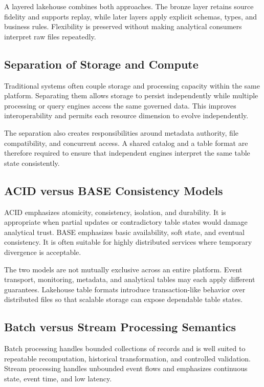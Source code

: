 A layered lakehouse combines both approaches. The bronze layer retains source fidelity and supports replay, while later layers apply explicit schemas, types, and business rules. Flexibility is preserved without making analytical consumers interpret raw files repeatedly.

\subsection{Separation of Storage and Compute}
Traditional systems often couple storage and processing capacity within the same platform. Separating them allows storage to persist independently while multiple processing or query engines access the same governed data. This improves interoperability and permits each resource dimension to evolve independently.

The separation also creates responsibilities around metadata authority, file compatibility, and concurrent access. A shared catalog and a table format are therefore required to ensure that independent engines interpret the same table state consistently.

\subsection{ACID versus BASE Consistency Models}
ACID emphasizes atomicity, consistency, isolation, and durability. It is appropriate when partial updates or contradictory table states would damage analytical trust. BASE emphasizes basic availability, soft state, and eventual consistency. It is often suitable for highly distributed services where temporary divergence is acceptable.

The two models are not mutually exclusive across an entire platform. Event transport, monitoring, metadata, and analytical tables may each apply different guarantees. Lakehouse table formats introduce transaction-like behavior over distributed files so that scalable storage can expose dependable table states.

\subsection{Batch versus Stream Processing Semantics}
Batch processing handles bounded collections of records and is well suited to repeatable recomputation, historical transformation, and controlled validation. Stream processing handles unbounded event flows and emphasizes continuous state, event time, and low latency.

